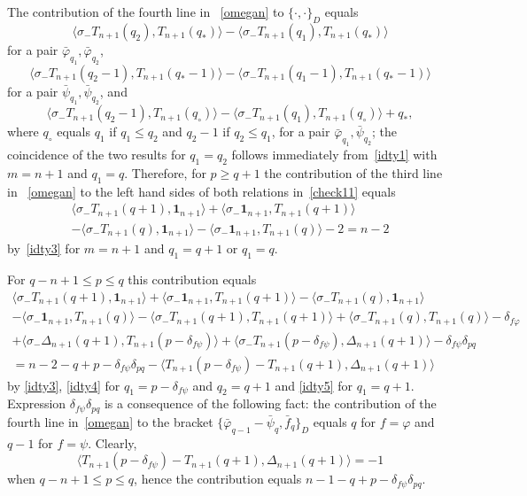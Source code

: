 \documentclass{amsart}
\theoremstyle{definition}
\theoremstyle{remark}
\numberwithin{equation}{section}
\numberwithin{theorem}{section}
\begin{document}
The contribution of the fourth line in ~\eqref{omegan} to ${{\{\cdot,\cdot\}}}_D$ equals
$$
\langle\sigma_-T_{n+1}(q_2),T_{n+1}(q_*)\rangle -\langle\sigma_-T_{n+1}(q_1),T_{n+1}(q_*)\rangle
$$
for a pair $\bar{{\varphi}}_{q_1}, \bar{{\varphi}}_{q_2}$,
$$
\langle\sigma_-T_{n+1}(q_2-1),T_{n+1}(q_*-1)\rangle -\langle\sigma_-T_{n+1}(q_1-1),T_{n+1}(q_*-1)\rangle
$$
for a pair $\bar{{\psi}}_{q_1}, \bar{{\psi}}_{q_2}$, and
$$\texttt{}
\langle\sigma_-T_{n+1}(q_2-1),T_{n+1}(q_\circ)\rangle -\langle\sigma_-T_{n+1}(q_1),T_{n+1}(q_\circ)\rangle
+q_*,
$$
where $q_\circ$ equals $q_1$ if $q_1\le q_2$ and $q_2-1$ if $q_2\le q_1$, 
for a pair $\bar{{\varphi}}_{q_1}, \bar{{\psi}}_{q_2}$; the coincidence of the two results for 
$q_1=q_2$ follows immediately from~\eqref{idty1} with $m=n+1$ and $q_1=q$. 
Therefore, for $p\ge q+1$ the  contribution of the third line 
in ~\eqref{omegan} to the left hand 
sides of  both relations in~\eqref{check11} equals
\begin{equation*}
\begin{split} 
\langle \sigma_-T_{n+1}(q+1),{\mathbf 1}_{n+1}\rangle +\langle \sigma_-{\mathbf 1}_{n+1},T_{n+1}(q+1)\rangle\\
-\langle \sigma_-T_{n+1}(q),{\mathbf 1}_{n+1}\rangle -\langle \sigma_-{\mathbf 1}_{n+1},T_{n+1}(q)\rangle-2=n-2
\end{split}
\end{equation*}
by~\eqref{idty3} for $m=n+1$ and $q_1=q+1$ or $q_1=q$. 

For $q-n+1\le p\le q$ this contribution equals
\begin{equation*}
\begin{split} 
\langle \sigma_-T_{n+1}(q+1),{\mathbf 1}_{n+1}\rangle +\langle \sigma_-{\mathbf 1}_{n+1},T_{n+1}(q+1)\rangle
-\langle \sigma_-T_{n+1}(q),{\mathbf 1}_{n+1}\rangle \\-\langle \sigma_-{\mathbf 1}_{n+1},T_{n+1}(q)\rangle
-\langle\sigma_-T_{n+1}(q+1), T_{n+1}(q+1)\rangle +\langle\sigma_- T_{n+1}(q), T_{n+1}(q)\rangle
-\delta_{f{{\varphi}}}\\+\langle\sigma_-\Delta_{n+1}(q+1), T_{n+1}(p-\delta_{f{{\psi}}})\rangle+\langle\sigma_-T_{n+1}(p-\delta_{f{{\psi}}}),
\Delta_{n+1}(q+1)\rangle-\delta_{f{{\psi}}}\delta_{pq}\\
=n-2-q+p-\delta_{f\psi}\delta_{pq}-\langle T_{n+1}(p-\delta_{f{{\psi}}})-T_{n+1}(q+1), \Delta_{n+1}(q+1)\rangle
\end{split}
\end{equation*}
by \eqref{idty3}, \eqref{idty4} for $q_1=p-\delta_{f{{\psi}}}$ and $q_2=q+1$ and \eqref{idty5} for $q_1=q+1$. Expression
$\delta_{f{{\psi}}}\delta_{pq}$ is a consequence of the following fact: the contribution of the fourth line 
in~\eqref{omegan} to the bracket
$\{\bar{{\varphi}}_{q-1}-\bar{{\psi}}_q, \bar f_q\}_D$
equals $q$ for  $f={{\varphi}}$ and $q-1$ for $f={{\psi}}$.
Clearly,
$$
\langle T_{n+1}(p-\delta_{f{{\psi}}})-T_{n+1}(q+1), \Delta_{n+1}(q+1)\rangle=-1
$$ 
when $q-n+1\le p\le q$, hence the contribution equals $n-1-q+p-\delta_{f{{\psi}}}\delta_{pq}$.
\end{document}
